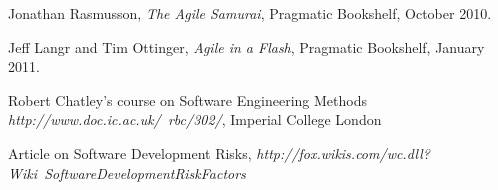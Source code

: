\documentclass[10pt]{article}
\begin{document}
\begin{thebibliography}{9}

  Jonathan Rasmusson,
  \emph{The Agile Samurai},
	Pragmatic Bookshelf,
	October 2010.

\bibitem{}
	Jeff Langr and Tim Ottinger,
	\emph{Agile in a Flash},
	Pragmatic Bookshelf, 
	January 2011.

\bibitem{}
	Robert Chatley's course on Software Engineering Methods
	\emph{http://www.doc.ic.ac.uk/~rbc/302/}, Imperial College London

\bibitem{}
	Article on Software Development Risks,
	\emph{http://fox.wikis.com/wc.dll?Wiki~SoftwareDevelopmentRiskFactors}

\end{thebibliography}
\end{document}

